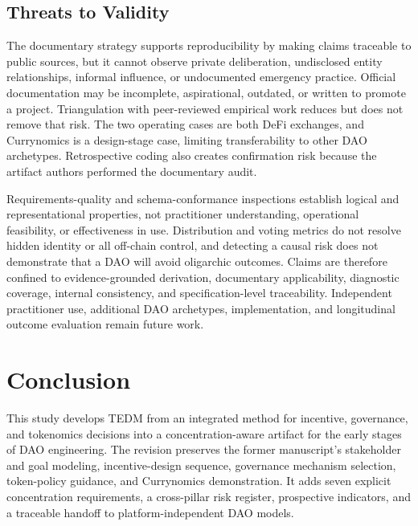 \documentclass[referee,sn-basic]{sn-jnl}
\begin{document}
\subsection{Threats to Validity}\label{subsec:validity}

The documentary strategy supports reproducibility by making claims traceable to
public sources, but it cannot observe private deliberation, undisclosed
entity relationships, informal influence, or undocumented emergency practice.
Official documentation may be incomplete, aspirational, outdated, or written
to promote a project. Triangulation with peer-reviewed empirical work reduces
but does not remove that risk. The two operating cases are both DeFi exchanges,
and Currynomics is a design-stage case, limiting transferability to other DAO
archetypes. Retrospective coding also creates confirmation risk because the
artifact authors performed the documentary audit.

Requirements-quality and schema-conformance inspections establish logical and
representational properties, not practitioner understanding, operational
feasibility, or effectiveness in use. Distribution and voting metrics do not
resolve hidden identity or all off-chain control, and detecting a causal risk
does not demonstrate that a DAO will avoid oligarchic outcomes. Claims are
therefore confined to evidence-grounded derivation, documentary applicability,
diagnostic coverage, internal consistency, and specification-level
traceability. Independent practitioner use, additional DAO archetypes,
implementation, and longitudinal outcome evaluation remain future work.

\section{Conclusion}\label{sec:conclusion}

This study develops TEDM from an integrated method for incentive, governance,
and tokenomics decisions into a concentration-aware artifact for the early
stages of DAO engineering. The revision preserves the former manuscript's
stakeholder and goal modeling, incentive-design sequence, governance mechanism
selection, token-policy guidance, and Currynomics demonstration. It adds seven
explicit concentration requirements, a cross-pillar risk register, prospective
indicators, and a traceable handoff to platform-independent DAO models.
\end{document}

